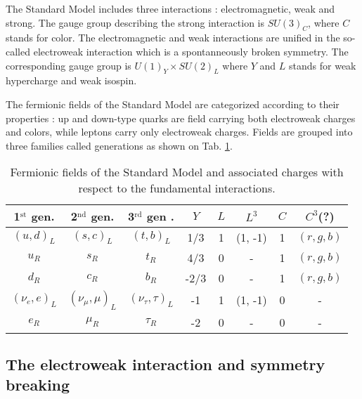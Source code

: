     The Standard Model includes three interactions : electromagnetic, weak and strong.
    The gauge group describing the strong interaction is $SU(3)_C$, where $C$ stands for
    color. The electromagnetic and weak interactions are unified in the so-called electroweak
    interaction which is a spontanneously broken symmetry. The corresponding gauge group
    is $U(1)_Y \times SU(2)_L$ where $Y$ and $L$ stands for weak hypercharge and
    weak isospin.

    The fermionic fields of the Standard Model are categorized according to their
    properties : up and down-type quarks are field carrying both electroweak charges and
    colors, while leptons carry only electroweak charges. Fields are grouped into
    three families called generations as shown on Tab. \ref{tab:StandardModelFields}.

    \begin{table}
        \centering
        \begin{tabular}{|ccc||c|cc|cc|}
            \hline
            1$^\text{st}$ gen. & 2$^\text{nd}$ gen. & 3$^\text{rd}$ gen . & $Y$  & $L$ & $L^3$   & $C$ & $C^3$(?) \\
            \hline
            \hline
            $(u, d)_L$         & $(s,c)_L$          & $(t,b)_L$           &  1/3 & 1   & (1, -1) & 1   & $(r, g, b)$ \\
            $u_R$              & $s_R$              & $t_R$               &  4/3 & 0   & -       & 1   & $(r, g, b)$ \\
            $d_R$              & $c_R$              & $b_R$               & -2/3 & 0   & -       & 1   & $(r, g, b)$ \\
            \hline
            \hline
            $(\nu_e, e)_L$     & $(\nu_\mu,\mu)_L$  & $(\nu_\tau,\tau)_L$ &  -1  & 1   & (1, -1) & 0   & - \\
            $e_R$              & $\mu_R$            & $\tau_R$            &  -2  & 0   & -       & 0   & - \\
            \hline
        \end{tabular}
        \caption{Fermionic fields of the Standard Model and associated charges with respect to
        the fundamental interactions.}
        \label{tab:StandardModelFields}
    \end{table}

        \subsection{The electroweak interaction and symmetry breaking}

